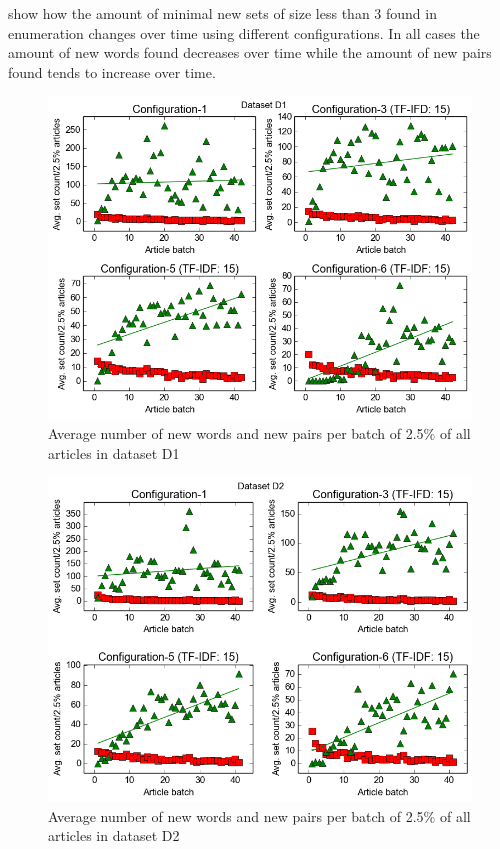  show how the amount of minimal new sets of size less than 3 found in enumeration changes over time using different configurations. In all cases the amount of new words found decreases over time while the amount of new pairs found tends to increase over time.

\begin{figure}[ht]
  \centering
  \includegraphics[scale=0.70]{images/D1-plot.png}
  \caption{Average number of new words and new pairs per batch of 2.5\% of all articles in dataset D1}
  \label{fig:setPlot1}
\end{figure}

\begin{figure}[ht]
  \centering
  \includegraphics[scale=0.70]{images/D2-plot.png}
  \caption{Average number of new words and new pairs per batch of 2.5\% of all articles in dataset D2}
  \label{fig:setPlot2}
\end{figure}

